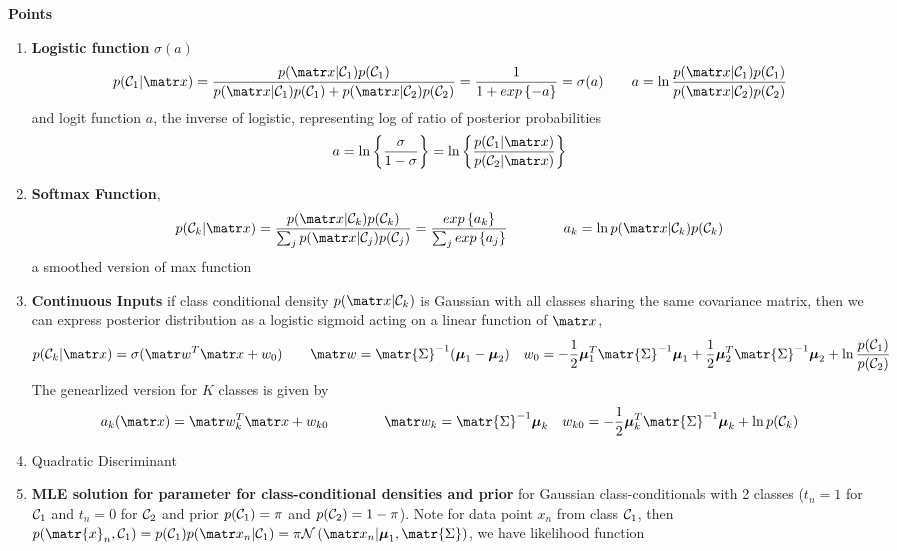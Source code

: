 \documentclass[11pt]{article}
\begin{document}
\begin{defn*}
    \textbf{Points}
    \begin{enumerate}
        \item \textbf{Logistic function} $\sigma(a)$ 
        \[
            p(\calC_1 | \bx) = \frac{p(\bx|\calC_1) p(\calC_1)}{p(\bx|\calC_1) p(\calC_1) + p(\bx|\calC_2) p(\calC_2)} = 
            \frac{1}{1+\exponents{-a}} = \sigma(a)
            \qquad 
            a = \ln{\frac{p(\bx|\calC_1) p(\calC_1)}{p(\bx|\calC_2) p(\calC_2)}}
        \]
        and logit function $a$, the inverse of logistic, representing log of ratio of posterior probabilities
        \[
            a 
            = \ln\left\{\frac{\sigma}{1-\sigma}\right\}
            = \ln\left\{ \frac{p(\calC_1 | \bx)}{p(\calC_2 | \bx)} \right\}
        \]
        \item \textbf{Softmax Function}, 
        \[
            p(\calC_k | \bx) = \frac{p(\bx|\calC_k)p(\calC_k)}{\sum_j p(\bx|\calC_j)p(\calC_j)} = \frac{\exponents{a_k}}{\sum_j \exponents{a_j}}
            \qqqquad 
            a_k = \ln{p(\bx|\calC_k) p(\calC_k)}
        \]
        a smoothed version of max function
        \item \textbf{Continuous Inputs} if class conditional density $p(\bx|\calC_k)$ is Gaussian with all classes sharing the same covariance matrix, then we can express posterior distribution as a logistic sigmoid acting on a linear function of $\bx$, 
        \[
            p(\calC_k | \bx) = \sigma(\bw^T \bx + w_0)
            \qquad 
            \bw = \matr{\Sigma}^{-1} (\bmu_1 - \bmu_2) 
            \quad 
            w_0 = -\frac{1}{2} \bmu_1^T \matr{\Sigma}^{-1} \bmu_1 + \frac{1}{2} \bmu_2^T \matr{\Sigma}^{-1} \bmu_2 + \ln{\frac{p(\calC_1)}{p(\calC_2)}}
        \]
        The genearlized version for $K$ classes is given by 
        \[
            a_k(\bx) = \bw_k^T \bx + w_{k0} 
            \qqqquad 
            \bw_k = \matr{\Sigma}^{-1} \bmu_k 
            \quad 
            w_{k0} = -\frac{1}{2} \bmu_k^T \matr{\Sigma}^{-1} \bmu_k + \ln{p(\calC_k)}
        \]
        \item Quadratic Discriminant
        \item \textbf{MLE solution for parameter for class-conditional densities and prior} for Gaussian class-conditionals with 2 classes ($t_n=1$ for $\mathcal{C}_1$ and $t_n=0$ for $\mathcal{C}_2$ and prior $p(\mathcal{C}_1)=\pi$ and $p(\mathcal{C}_2)=1-\pi$). Note for data point $x_n$ from class $\mathcal{C}_1$, then $p(\matr{x}_n, \calC_1)=  p(\calC_1)p(\bx_n | \calC_1) = \pi \normal{\bx_n | \bmu_1, \matr{\Sigma}}$, we have likelihood function

\end{enumerate}
\end{defn*}
\end{document}
